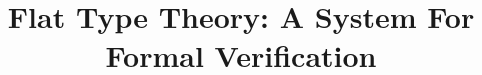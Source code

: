 \documentclass[]{article}
\title{Flat Type Theory: A System For Formal Verification}
\author{}
\begin{document}
\maketitle

\listoftodos

\begin{abstract}

\todo{}
\end{abstract}








\nocite{*}
\printbibliography


\end{document}
